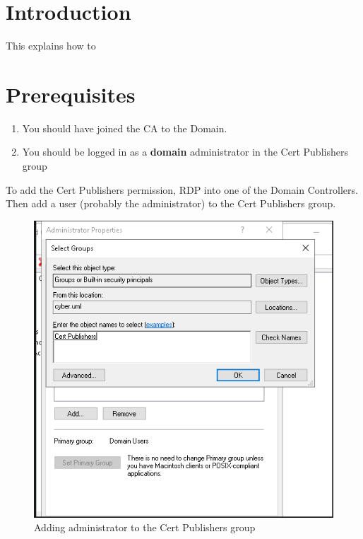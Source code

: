 \documentclass{article}
\begin{document}
\graphicspath{ {./Images/} }
\tableofcontents

\section{Introduction}
This explains how to 

\section{Prerequisites}
\begin {enumerate}
\item You should have joined the CA to the Domain.
\item You should be logged in as a \textbf{domain} administrator in the Cert Publishers group
\end {enumerate}

To add the Cert Publishers permission, RDP into one of the Domain Controllers.
Then add a user (probably the administrator) to the Cert Publishers group.

\begin{figure}[H]
        \centering
        \includegraphics[width=1\textwidth]{AddingCertPublisherPermission.png}
        \caption{Adding administrator to the Cert Publishers group}
        \label{fig:AddingCertPublisherPermission}
\end{figure}
\end{document}
